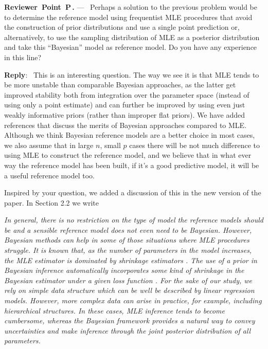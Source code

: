 \documentclass[11pt]{article}
\newcounter{reviewer}
\newcounter{point}[reviewer]
\renewcommand{\thepoint}{P\,\thereviewer.\arabic{point}}
\newenvironment{point}
   {\refstepcounter{point} \bigskip \noindent \begin{sf}{\textbf{Reviewer~Point~\thepoint} } ---\ }
   {\par \end{sf}}
\newenvironment{reply}
   {\medskip \noindent \textbf{Reply}:\  }
   {\medskip}
\newcommand{\todo}{\subsection*{\textcolor{red}{To do (comment out when done)}:}}
\begin{document}

\begin{point}
Perhaps a solution to the previous problem would be to determine the reference model using frequentist MLE procedures that avoid the construction of prior distributions and use a single point prediction or, alternatively, to use the sampling distribution of MLE as a posterior distribution and take this “Bayesian” model as reference model. Do you have any experience in this line?
\end{point}

\begin{reply}
This is an interesting question. The way we see it is that MLE tends to be more unstable than comparable Bayesian approaches, as the latter get improved stability both from integration over the parameter space (instead of using only a point estimate) and can further be improved by using even just weakly informative priors (rather than improper flat priors). We have added references that discuss the merits of Bayesian approaches compared to MLE. Although we think Bayesian reference models are a better choice in most cases, we also assume that in large $n$, small $p$ cases there will be not much difference to using MLE to construct the reference model, and we believe that in what ever way the reference model has been built, if it's a good predictive model, it will be a useful reference model too.

Inspired by your question, we added a discussion of this in the new version of the paper. In Section 2.2 we write

\vspace{0.5\baselineskip}
\textit{In general, there is no restriction on the type of model the reference models 
	should be and a sensible reference model does not even need to be Bayesian.
	However, Bayesian methods can help in some of those situations
	where MLE procedures struggle. 
	It is known that, as the number of parameters in the model increases, the MLE
	estimator is dominated by shrinkage estimators 
	\citep{stein1956inadmissibility, stein1961estimation, parmigiani2009decision, efron2011tweedie}.
	The use of a prior in Bayesian inference automatically incorporates 
	some kind of shrinkage in the Bayesian estimator under a given loss function \citep[see, e.g.][]{rockova2012hierarchical}. 
	For the sake of our study, we rely on simple data structure which can be well be described 
	by linear regression models. However, more complex data can arise in practice, for example, including hierarchical structures. In these cases, MLE inference tends to become cumbersome, whereas the Bayesian framework provides a natural way to convey uncertainties and make inference through the joint posterior distribution of all parameters.}

\vspace{0.5\baselineskip}

\end{reply}
\end{document}
